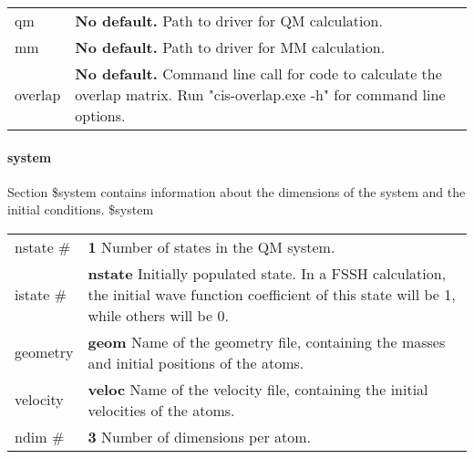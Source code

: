 \documentclass{report}
\begin{document}
\begin{tabularx}{\textwidth}{ m{2.5cm} X }
qm				&
	\textbf{No default.} \newline
	Path to driver for QM calculation.  \\

mm				&
	\textbf{No default.} \newline
	Path to driver for MM calculation.  \\

overlap				&
    	\textbf{No default.} \newline
	Command line call for code to calculate the overlap matrix. Run "cis-overlap.exe -h" for command line options.
\end{tabularx}

\paragraph{system}
Section \$system contains information about the dimensions of the system and the initial conditions. \newline
\$system

\begin{tabularx}{\textwidth}{ m{2.5cm} X }
nstate \#		&
\textbf{1} \newline
Number of states in the QM system.  \\

istate \#		&
\textbf{nstate} \newline
Initially populated state. In a FSSH calculation, the initial wave function coefficient of this state will be 1, while others will be 0.  \\

geometry 		&
\textbf{geom} \newline
Name of the geometry file, containing the masses and initial positions of the atoms.  \\

velocity		&
\textbf{veloc} \newline
Name of the velocity file, containing the initial velocities of the atoms.  \\

ndim \#		&
\textbf{3} \newline
Number of dimensions per atom.  \\	
\end{tabularx}
\end{document}
